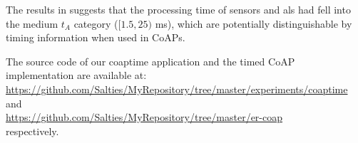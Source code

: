 The results in  suggests that the processing time of sensors and als had fell into the medium $t_A$ category ($[1.5, 25)$ ms), which are potentially distinguishable by timing information when used in CoAPs.

The source code of our coaptime application and the timed CoAP implementation are available at: \\
\url{https://github.com/Salties/MyRepository/tree/master/experiments/coaptime}\\
and \\
\url{https://github.com/Salties/MyRepository/tree/master/er-coap} \\
respectively.

%
%
%
%
%
